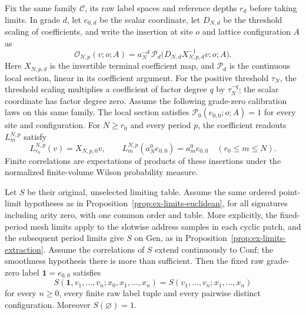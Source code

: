 \begin{proposition}
\label{prop:ex-limits-unit}
Fix the same family $\mathcal C$, its raw label spaces and reference depths
$r_d$ before taking limits. In grade $d$, let $e_{0,d}$ be the scalar
coordinate, let $D_{N,d}$ be the threshold scaling of coefficients, and
write the insertion at site $o$ and lattice configuration $A$ as
\begin{equation}\label{eq:ex-limits-unit-insertion}
 \mathcal O_{N,p}(v;o;A)
 =a_N^{-d}\,\mathcal P_d\bigl(D_{N,d}X_{N,p,d}^{-1}v;o;A\bigr).
\end{equation}
Here $X_{N,p,d}$ is the invertible terminal coefficient map, and
$\mathcal P_d$ is the continuous local section, linear in its coefficient
argument.
For the positive threshold $\tau_N$, the threshold scaling multiplies a
coefficient of factor degree $q$ by
$\tau_N^{-q}$; the scalar coordinate has factor degree zero.
Assume the following grade-zero calibration laws on this same family.
The local section satisfies $\mathcal P_0(e_{0,0};o;A)=1$ for every site
and configuration. For $N\ge r_0$ and every period $p$, the coefficient
readouts $L_{m}^{N,p}$ satisfy
\[
 L_{r_0}^{N,p}(v)=X_{N,p,0}v,
 \qquad L_m^{N,p}(a_N^0e_{0,0})=a_m^0e_{0,0}
       \quad(r_0\le m\le N).
\]
Finite correlations are expectations of products of these insertions
under the normalized finite-volume Wilson probability measure.

Let $S$ be their original, unselected limiting table. Assume the same
ordered point-limit hypotheses as in
Proposition~\ref{prop:ex-limits-euclidean}, for all signatures including
arity zero, with one common order and table. More explicitly, the
fixed-period mesh limits apply to the slotwise address samples in each
cyclic patch, and the subsequent period limits give $S$ on
$\mathrm{Gen}$, as in Proposition~\ref{prop:ex-limits-extraction}.
Assume the correlations of $S$ extend continuously to $\mathrm{Conf}$;
the smoothness hypothesis there is more than sufficient.
Then the fixed raw grade-zero label $\mathbf1=e_{0,0}$ satisfies
\begin{equation}\label{eq:ex-limits-unit-law}
 S(\mathbf1,v_1,\ldots,v_n;x_0,x_1,\ldots,x_n)
 =S(v_1,\ldots,v_n;x_1,\ldots,x_n)
\end{equation}
for every $n\ge0$, every finite raw label tuple and every pairwise distinct
configuration. Moreover $S(\varnothing)=1$.
\end{proposition}

